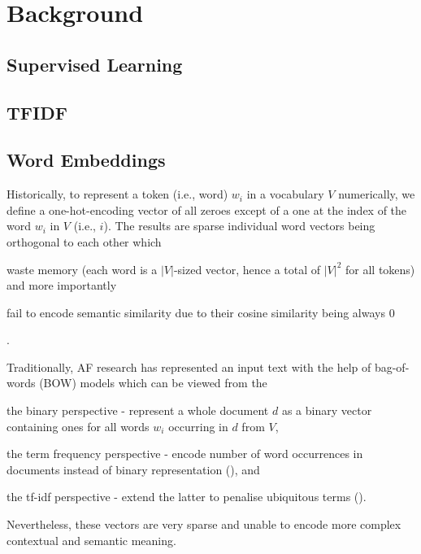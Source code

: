 \section{Background}\label{sec:background}

\subsection{Supervised Learning}\label{subsec:supervised-learning}

\subsection{TFIDF}\label{subsec:tfidf}

\subsection{Word Embeddings}\label{subsec:word-embeddings}
Historically, to represent a token (i.e., word) $w_{i}$ in a vocabulary $V$ numerically, we define a one-hot-encoding vector of all zeroes except of a one at the index of the word $w_{i}$ in $V$ (i.e., $i$). 
The results are sparse individual word vectors being orthogonal to each other which \begin{enumerate*}
    \item waste memory (each word is a $|V|$-sized vector, hence a total of $|V|^{2}$ for all tokens) and more importantly
    \item fail to encode semantic similarity due to their cosine similarity being always 0
\end{enumerate*}. 

Traditionally, AF research has represented an input text with the help of bag-of-words (BOW) models which can be viewed from the  \begin{enumerate*}
    \item the binary perspective - represent a whole document $d$ as a binary vector containing ones for all words $w_{i}$ occurring in $d$ from $V$, 
    \item the term frequency perspective - encode number of word occurrences in documents instead of binary representation (\cite{Xu2013AnAT}), and 
    \item the tf-idf perspective - extend the latter to penalise ubiquitous terms (\cite{SprckJones1972ASI}).
\end{enumerate*} 
Nevertheless, these vectors are very sparse and unable to encode more complex contextual and semantic meaning.



